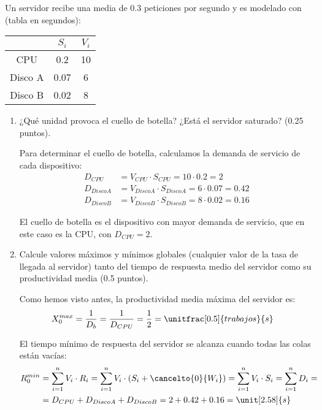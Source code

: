 \documentclass[12pt]{article}
\begin{document}
    \begin{ejercicio}[2 puntos]
        Un servidor recibe una media de $0.3$ peticiones por segundo y es modelado con (tabla en segundos):
        \begin{table}[H]
        \centering
        \begin{tabular}{c|c|c}
            & $S_i$ & $V_i$ \\
            \hline
            CPU & 0.2 & 10 \\
            Disco A & 0.07 & 6 \\
            Disco B & 0.02 & 8
        \end{tabular}
        \end{table}

        \begin{enumerate}
            \item ¿Qué unidad provoca el cuello de botella? ¿Está el servidor saturado? (0.25 puntos).
            
            Para determinar el cuello de botella, calculamos la demanda de servicio de cada dispositivo:
            \begin{align*}
                D_{CPU} &= V_{CPU}\cdot S_{CPU} = 10\cdot 0.2 = 2\\
                D_{Disco A} &= V_{Disco A}\cdot S_{Disco A} = 6\cdot 0.07 = 0.42\\
                D_{Disco B} &= V_{Disco B}\cdot S_{Disco B} = 8\cdot 0.02 = 0.16
            \end{align*}

            El cuello de botella es el dispositivo con mayor demanda de servicio, que en este caso es la CPU, con $D_{CPU} = 2$.
            \item Calcule valores máximos y mínimos globales (cualquier valor de la tasa de llegada al servidor) tanto del tiempo de respuesta medio del servidor como su productividad media (0.5 puntos).
            
            Como hemos visto antes, la productividad media máxima del servidor es:
            \begin{align*}
                X_0^{max} &= \frac{1}{D_b} = \frac{1}{D_{CPU}} = \frac{1}{2} = \unitfrac[0.5]{trabajos}{s}
            \end{align*}

            El tiempo mínimo de respuesta del servidor se alcanza cuando todas las colas están vacías:
            \begin{align*}
                R_{0}^{min} &= \sum_{i=1}^{n} V_i\cdot R_i = \sum_{i=1}^{n} V_i\cdot (S_i + \cancelto{0}{W_i})
                = \sum_{i=1}^{n} V_i\cdot S_i
                = \sum_{i=1}^{n} D_i
                =\\&= D_{CPU} + D_{Disco A} + D_{Disco B} = 2 + 0.42 + 0.16 = \unit[2.58]{s}
            \end{align*}


\end{enumerate}
\end{ejercicio}
\end{document}
